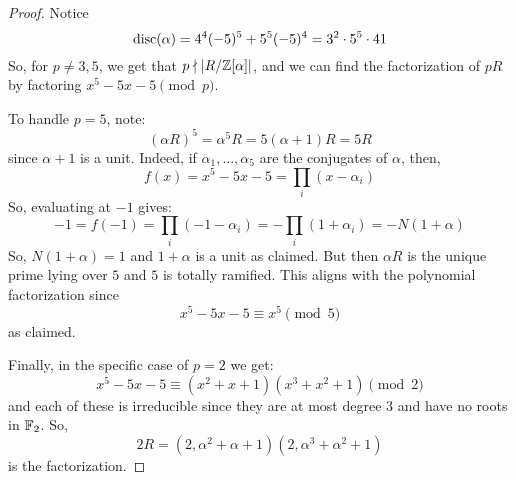 \begin{proof}
	Notice
	\[ \operatorname{disc}(\alpha) = 4^4(-5)^5+5^5(-5)^4 = 3^2 \cdot 5^5 \cdot 41 \]
	So, for $p \neq 3,5$, we get that $p \nmid |R/\mathbb{Z}[\alpha]|$, and we can find the factorization of $pR$ by factoring $x^5-5x-5 \pmod{p}$.
	
	To handle $p=5$, note:
	\[ (\alpha R)^5 = \alpha^5R = 5(\alpha+1)R = 5R \]
	since $\alpha+1$ is a unit. Indeed, if $\alpha_1,\ldots,\alpha_5$ are the conjugates of $\alpha$, then,
	\[ f(x) = x^5-5x-5 = \prod_i (x-\alpha_i) \]
	So, evaluating at $-1$ gives:
	\[ -1 = f(-1) = \prod_i (-1-\alpha_i) = -\prod_i (1+\alpha_i) = -N(1+\alpha) \]
	So, $N(1+\alpha)=1$ and $1+\alpha$ is a unit as claimed. But then $\alpha R$ is the unique prime lying over $5$ and $5$ is totally ramified. This aligns with the polynomial factorization since
	\[ x^5-5x-5 \equiv x^5 \pmod{5} \]
	as claimed.
	
	Finally, in the specific case of $p=2$ we get:
	\[ x^5-5x-5 \equiv (x^2+x+1)(x^3+x^2+1) \pmod{2} \]
	and each of these is irreducible since they are at most degree 3 and have no roots in $\mathbb{F}_2$. So,
	\[ 2R = (2,\alpha^2+\alpha+1)(2,\alpha^3+\alpha^2+1) \]
	is the factorization.
\end{proof}
